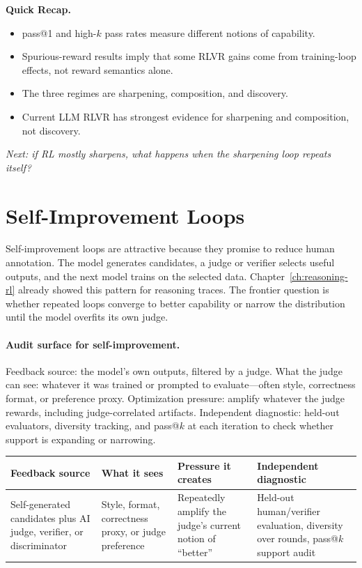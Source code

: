 \begin{quickrecap}
\textbf{Quick Recap.}
\begin{itemize}[nosep,leftmargin=1.5em]
  \item pass@1 and high-$k$ pass rates measure different notions of capability.
  \item Spurious-reward results imply that some RLVR gains come from training-loop effects, not reward semantics alone.
  \item The three regimes are sharpening, composition, and discovery.
  \item Current LLM RLVR has strongest evidence for sharpening and composition, not discovery.
\end{itemize}
\textit{Next: if RL mostly sharpens, what happens when the sharpening loop repeats itself?}
\end{quickrecap}


\section{Self-Improvement Loops}
\label{sec:self-improvement}

Self-improvement loops are attractive because they promise to reduce human annotation. The model generates candidates, a judge or verifier selects useful outputs, and the next model trains on the selected data. Chapter~\ref{ch:reasoning-rl} already showed this pattern for reasoning traces. The frontier question is whether repeated loops converge to better capability or narrow the distribution until the model overfits its own judge.

\paragraph{Audit surface for self-improvement.} Feedback source: the model's own outputs, filtered by a judge. What the judge can see: whatever it was trained or prompted to evaluate---often style, correctness format, or preference proxy. Optimization pressure: amplify whatever the judge rewards, including judge-correlated artifacts. Independent diagnostic: held-out evaluators, diversity tracking, and pass@$k$ at each iteration to check whether support is expanding or narrowing.

\begin{center}
\small
\begin{tabularx}{\textwidth}{@{}p{3.2cm}p{3.1cm}p{3.4cm}X@{}}
\toprule
\textbf{Feedback source} & \textbf{What it sees} & \textbf{Pressure it creates} & \textbf{Independent diagnostic} \\
\midrule
Self-generated candidates plus AI judge, verifier, or discriminator & Style, format, correctness proxy, or judge preference & Repeatedly amplify the judge's current notion of ``better'' & Held-out human/verifier evaluation, diversity over rounds, pass@$k$ support audit \\
\bottomrule
\end{tabularx}
\normalsize
\end{center}

